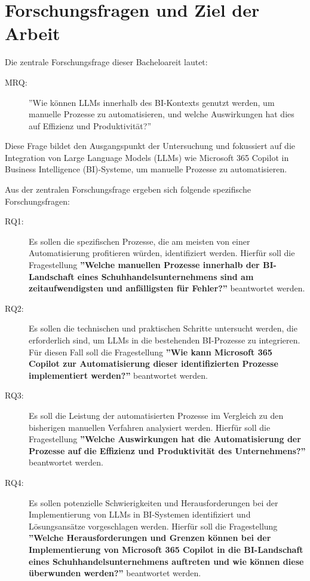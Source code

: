 
\section{Forschungsfragen und Ziel der Arbeit}

Die zentrale Forschungsfrage dieser Bacheloareit lautet:

\begin{description}
    \item[MRQ:] ''Wie können LLMs innerhalb des BI-Kontexts genutzt werden, um manuelle Prozesse zu automatisieren, und welche Auswirkungen hat dies auf Effizienz und Produktivität?''
\end{description}
Diese Frage bildet den Ausgangspunkt der Untersuchung und fokussiert auf die Integration von Large Language Models (LLMs) wie Microsoft 365 Copilot in Business Intelligence (BI)-Systeme, um manuelle Prozesse zu automatisieren.

Aus der zentralen Forschungsfrage ergeben sich folgende spezifische Forschungsfragen:
\begin{description}
    \item[RQ1:] Es sollen die spezifischen Prozesse, die am meisten von einer Automatisierung profitieren würden, identifiziert werden. Hierfür soll die Fragestellung \textbf{''Welche manuellen Prozesse innerhalb der BI-Landschaft eines Schuhhandelsunternehmens sind am zeitaufwendigsten und anfälligsten für Fehler?''} beantwortet werden.
    \item[RQ2:] Es sollen die technischen und praktischen Schritte untersucht werden, die erforderlich sind, um LLMs in die bestehenden BI-Prozesse zu integrieren. Für diesen Fall soll die Fragestellung \textbf{''Wie kann Microsoft 365 Copilot zur Automatisierung dieser identifizierten Prozesse implementiert werden?''} beantwortet werden.
    \item[RQ3:] Es soll die Leistung der automatisierten Prozesse im Vergleich zu den bisherigen manuellen Verfahren analysiert werden. Hierfür soll die Fragestellung \textbf{''Welche Auswirkungen hat die Automatisierung der Prozesse auf die Effizienz und Produktivität des Unternehmens?''} beantwortet werden. 
    \item[RQ4:] Es sollen potenzielle Schwierigkeiten und Herausforderungen bei der Implementierung von LLMs in BI-Systemen identifiziert und Lösungsansätze vorgeschlagen werden. Hierfür soll die Fragestellung \textbf{''Welche Herausforderungen und Grenzen können bei der Implementierung von Microsoft 365 Copilot in die BI-Landschaft eines Schuhhandelsunternehmens auftreten und wie können diese überwunden werden?''} beantwortet werden. 
\end{description}

